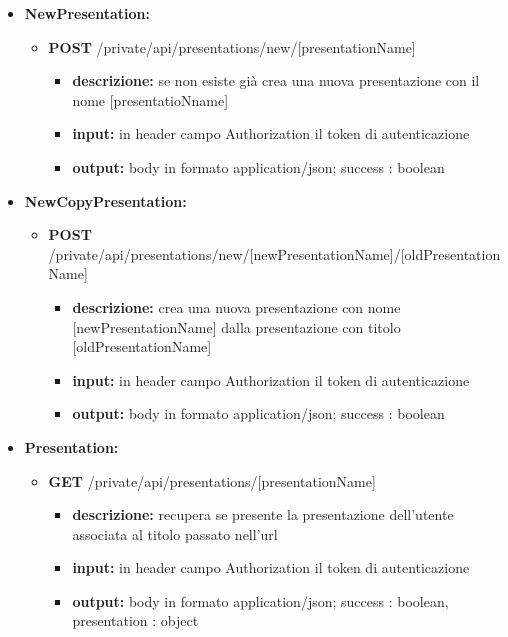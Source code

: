 {{\begin{itemize}
		\item \textbf{NewPresentation:}
			\begin{itemize}
			\item  \textbf{POST} /private/api/presentations/new/[presentationName] 
				\begin{itemize} 
				\item \textbf{descrizione:} se non esiste gi\`{a} crea una nuova presentazione con il nome [presentatioNname]
				\item \textbf{input:} in header campo Authorization il token di autenticazione
				\item \textbf{output:}  body in formato application/json; success : boolean
				\end{itemize}
			\end{itemize}
			
		\item \textbf{NewCopyPresentation:}
			\begin{itemize}
			\item  \textbf{POST} /private/api/presentations/new/[newPresentationName]/[oldPresentationName]
				\begin{itemize} 
				\item \textbf{descrizione:} crea una nuova presentazione con nome [newPresentationName] dalla presentazione con titolo [oldPresentationName]
				\item \textbf{input:} in header campo Authorization il token di autenticazione
				\item \textbf{output:}  body in formato application/json; success : boolean
				\end{itemize}
			\end{itemize}

			
		\item \textbf{Presentation:}
			\begin{itemize}
			\item  \textbf{GET} /private/api/presentations/[presentationName]
				\begin{itemize} 
				\item \textbf{descrizione:} recupera se presente la presentazione dell'utente associata al titolo passato nell'url
				\item \textbf{input:} in header campo Authorization il token di autenticazione
				\item \textbf{output:} body in formato application/json; success : boolean, presentation : object
				\end{itemize}
				

\end{itemize}
\end{itemize}}}
